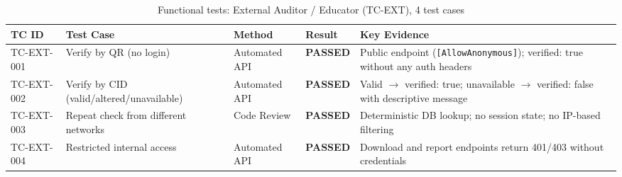 \begin{table}[H]
  \centering
  \smalltable
  \footnotesize
  {%
  \setlength{\tabcolsep}{4pt}
  \renewcommand{\arraystretch}{1.3}
  \begin{tabular}{|>{\raggedright\arraybackslash}p{}|
                  >{\raggedright\arraybackslash}p{}|
                  >{\raggedright\arraybackslash}p{}|
                  >{\centering\arraybackslash}p{}|
                  >{\raggedright\arraybackslash}p{}|}
    \hline
    \textbf{TC ID} & \textbf{Test Case} & \textbf{Method} & \textbf{Result} & \textbf{Key Evidence} \\
    \hline\hline
    TC-EXT-001 & Verify by QR (no login) & Automated API & \textbf{PASSED} & Public endpoint (\texttt{[AllowAnonymous]}); verified: true without any auth headers \\
    \hline
    TC-EXT-002 & Verify by CID (valid/altered/unavailable) & Automated API & \textbf{PASSED} & Valid $\rightarrow$ verified: true; unavailable $\rightarrow$ verified: false with descriptive message \\
    \hline
    TC-EXT-003 & Repeat check from different networks & Code Review & \textbf{PASSED} & Deterministic DB lookup; no session state; no IP-based filtering \\
    \hline
    TC-EXT-004 & Restricted internal access & Automated API & \textbf{PASSED} & Download and report endpoints return 401/403 without credentials \\
    \hline
  \end{tabular}
  }%
  \captionsetup{type=table}
  \caption{Functional tests: External Auditor / Educator (TC-EXT), 4 test cases}
  \label{tab:func-ext}
\end{table}

